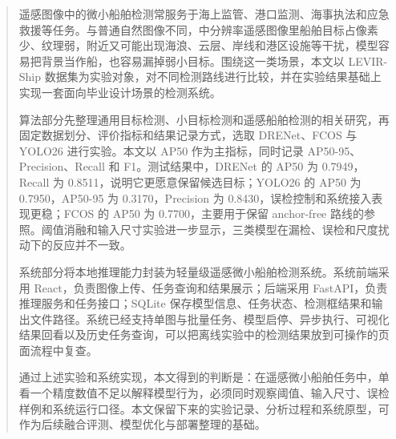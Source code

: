 \newcommand{\keywordsCn}[1][遥感图像；微小船舶检测；LEVIR-Ship；目标检测；检测系统]{#1}
\begin{abstract}
    遥感图像中的微小船舶检测常服务于海上监管、港口监测、海事执法和应急救援等任务。与普通自然图像不同，中分辨率遥感图像里船舶目标占像素少、纹理弱，附近又可能出现海浪、云层、岸线和港区设施等干扰，模型容易把背景当作船，也容易漏掉弱小目标。围绕这一类场景，本文以 LEVIR-Ship 数据集为实验对象，对不同检测路线进行比较，并在实验结果基础上实现一套面向毕业设计场景的检测系统。

    算法部分先整理通用目标检测、小目标检测和遥感船舶检测的相关研究，再固定数据划分、评价指标和结果记录方式，选取 DRENet、FCOS 与 YOLO26 进行实验。本文以 AP50 作为主指标，同时记录 AP50-95、Precision、Recall 和 F1。测试结果中，DRENet 的 AP50 为 0.7949，Recall 为 0.8511，说明它更愿意保留候选目标；YOLO26 的 AP50 为 0.7950，AP50-95 为 0.3170，Precision 为 0.8430，误检控制和系统接入表现更稳；FCOS 的 AP50 为 0.7700，主要用于保留 anchor-free 路线的参照。阈值消融和输入尺寸实验进一步显示，三类模型在漏检、误检和尺度扰动下的反应并不一致。

    系统部分将本地推理能力封装为轻量级遥感微小船舶检测系统。系统前端采用 React，负责图像上传、任务查询和结果展示；后端采用 FastAPI，负责推理服务和任务接口；SQLite 保存模型信息、任务状态、检测框结果和输出文件路径。系统已经支持单图与批量任务、模型启停、异步执行、可视化结果回看以及历史任务查询，可以把离线实验中的检测结果放到可操作的页面流程中复查。

    通过上述实验和系统实现，本文得到的判断是：在遥感微小船舶任务中，单看一个精度数值不足以解释模型行为，必须同时观察阈值、输入尺寸、误检样例和系统运行口径。本文保留下来的实验记录、分析过程和系统原型，可作为后续融合评测、模型优化与部署整理的基础。
\end{abstract}

